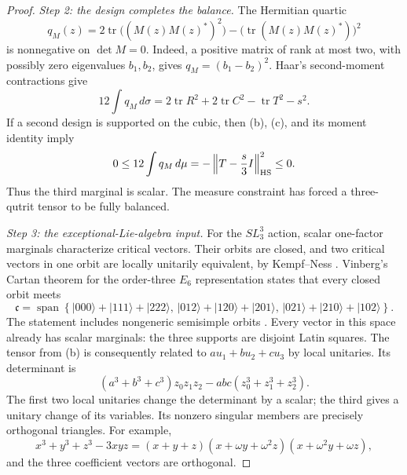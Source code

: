 \begin{proof}
\emph{Step 2: the design completes the balance.}
The Hermitian quartic
\[
 q_M(z)=2\operatorname{tr}\bigl((M(z)M(z)^*)^2\bigr)
       -\bigl(\operatorname{tr}(M(z)M(z)^*)\bigr)^2
\]
is nonnegative on \(\det M=0\). Indeed, a positive matrix of rank at most
two, with possibly zero eigenvalues \(b_1,b_2\), gives
\(q_M=(b_1-b_2)^2\). Haar's second-moment contractions give
\[
 12\int q_M\,d\sigma
 =2\operatorname{tr}R^2+2\operatorname{tr}C^2
      -\operatorname{tr}T^2-s^2.
 \tag{c}
\]
If a second design is supported on the cubic, then (b), (c), and its
moment identity imply
\[
 0\le12\int q_M\,d\mu
 =-\left\|T-\frac{s}{3}I\right\|_{\rm HS}^2\le0.
\]
Thus the third marginal is scalar. The measure constraint has forced a
three-qutrit tensor to be fully balanced.


\emph{Step 3: the exceptional-Lie-algebra input.}
For the \(SL_3^3\) action, scalar one-factor marginals characterize
critical vectors. Their orbits are closed, and two critical vectors in
one orbit are locally unitarily equivalent, by Kempf--Ness
\cite[Theorem 14]{geo_sauerwein2018}. Vinberg's Cartan theorem for the
order-three \(E_6\) representation states that every closed orbit meets
\[
 \mathfrak c=\operatorname{span}\left\{
 |000\rangle+|111\rangle+|222\rangle,\,
 |012\rangle+|120\rangle+|201\rangle,\,
 |021\rangle+|210\rangle+|102\rangle\right\}.
\]
The statement includes nongeneric semisimple orbits
\cite[Section 7.1]{geo_ditrani2023}. Every vector in this space already
has scalar marginals: the three supports are disjoint Latin squares.
The tensor from (b) is consequently related to \(a u_1+b u_2+c u_3\)
by local unitaries. Its determinant is
\[
 (a^3+b^3+c^3)z_0z_1z_2
             -abc(z_0^3+z_1^3+z_2^3).
 \tag{d}
\]
The first two local unitaries change the determinant by a scalar; the
third gives a unitary change of its variables. Its nonzero singular
members are precisely orthogonal triangles. For example,
\[
 x^3+y^3+z^3-3xyz
 =(x+y+z)(x+\omega y+\omega^2z)(x+\omega^2y+\omega z),
\]
and the three coefficient vectors are orthogonal.


\end{proof}
